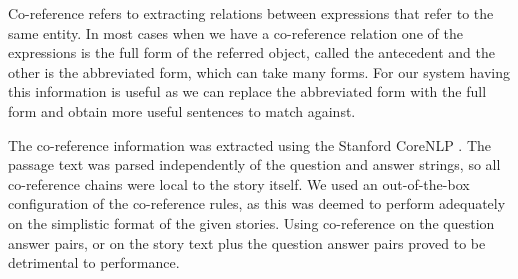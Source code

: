 Co-reference refers to extracting relations between expressions that refer to the same entity. In most cases when we have a co-reference relation one of the expressions is the full form of the referred object, called the antecedent and the other is the abbreviated form, which can take many forms. For our system having this information is useful as we can replace the abbreviated form with the full form and obtain more useful sentences to match against. 

The co-reference information was extracted using the Stanford CoreNLP \cite{manning2014stanford}. The passage text was parsed independently of the question and answer strings, so all co-reference chains were local to the story itself. We used an out-of-the-box configuration of the co-reference rules, as this was deemed to perform adequately on the simplistic format of the given stories. Using co-reference on the question answer pairs, or on the story text plus the question answer pairs proved to be detrimental to performance.